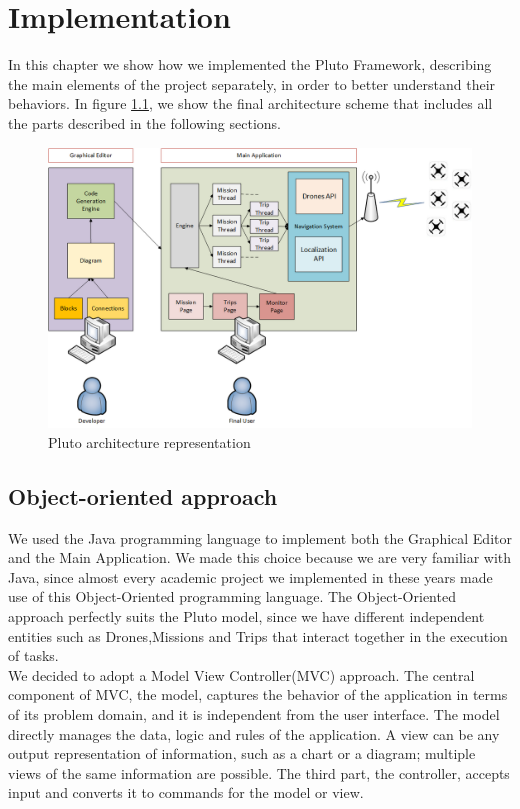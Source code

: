 \chapter{Implementation}
\label{cap5}

In this chapter we show how we implemented the Pluto Framework, describing the main elements of the project separately, in order to better understand their behaviors.
In figure \ref{fig:finalArchitecture}, we show the final architecture scheme that includes all the parts described in the following sections.
\\

\begin{figure}[h!]
\includegraphics[width=\linewidth]
{pictures/Final_Architecture.png}
\caption{Pluto architecture representation}
\label{fig:finalArchitecture}
\end{figure}

\section{Object-oriented approach}\label{oomodel}

We used the Java programming language to implement both the Graphical Editor and the Main Application.
We made this choice because we are very familiar with Java, since almost every academic project we implemented in these years made use of this Object-Oriented programming language.
The Object-Oriented approach perfectly suits the Pluto model, since we have different independent entities such as Drones,Missions and Trips that interact together in the execution of tasks.
\\

We decided to adopt a Model View Controller(MVC) approach.
The central component of MVC, the model, captures the behavior of the application in terms of its problem domain, and it is independent from the user interface.
The model directly manages the data, logic and rules of the application.
A view can be any output representation of information, such as a chart or a diagram; multiple views of the same information are possible.
The third part, the controller, accepts input and converts it to commands for the model or view.
\\

